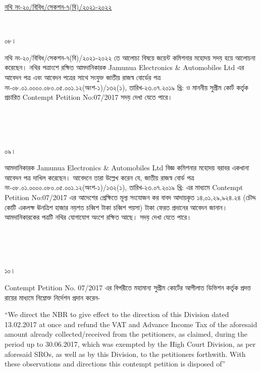 \documentclass[12pt]{article}
\begin{document}
\begin{minipage}[t]{0.59\linewidth}
\hspace{0.5em}
\end{minipage}
\begin{minipage}[t]{1\textwidth}
\underline{নথি নং-২০/বিবিধ/সেকশন-৭(বি)/২০২১-২০২২}
\end{minipage}
\\
\begin{minipage}[t]{0.05\linewidth}
০৮।
\end{minipage}
\begin{minipage}[t]{1\linewidth}
নথি নং-২০/বিবিধ/সেকশন-৭(বি)/২০২১-২০২২
তে আলোচ্য বিষয়ে জয়েন্ট কমিশনার মহোদয়
সদয় হয়ে আলোচনা করেছেন।
নথির পত্রাংশে রক্ষিত আমদানিকারক
Jamunua Electronics \& Automobiles Ltd
এর আবেদন পত্র এবং আবেদন পত্রের সাথে সংযুক্ত
জাতীয় রাজস্ব বোর্ডের পত্র
নং-০৮.০১.০০০০.০৮০.০৫.০০১.১২(অংশ-১)/১৩২(১),
তারিখ-২৩.০৭.২০১৯ খ্রি:
ও মাননীয় সুপ্রীম কোর্ট কর্তৃক প্রচারিত
Contempt Petition No:07/2017
সদয় দেখা যেতে পারে।
\end{minipage}
\\
\\
\\
\begin{minipage}[t]{0.05\linewidth}
০৯।
\end{minipage}
\begin{minipage}[t]{1\linewidth}
আমদানিকারক
Jamunua Electronics \& Automobiles Ltd
বিজ্ঞ কমিশনার মহোদয় বরাবর
একখানা আবেদন পত্র দাখিল
করেছেন। আবেদনে তারা উল্লেখ করেন যে,
জাতীয় রাজস্ব বোর্ড পত্র
নং-০৮.০১.০০০০.০৮০.০৫.০০১.১২(অংশ-১)/১৩২(১),
তারিখ-২৩.০৭.২০১৯ খ্রি:
এর মাধ্যমে
Contempt Petition No:07/2017
এর আদেশের প্রেক্ষিতে মূল্য সংযোজন কর
বাবদ আদায়কৃত
১৪,০১,২৯,৯২৪.২৪
(চৌদ্দ কোটি একলক্ষ ঊনত্রিশ হাজার নয়শত চব্বিশ টাকা চব্বিশ পয়সা) টাকা
ফেরত প্রদানের আবেদন জানান।
আমদানিকারকের পত্রটি নথির যোগাযোগ
অংশে রক্ষিত আছে।
সদয় দেখা যেতে পারে।
\end{minipage}
\\
\\
\\
\begin{minipage}[t]{0.05\linewidth}
১০।
\end{minipage}
\begin{minipage}[t]{1\linewidth}
Contempt Petition No. 07/2017
এর বিপরীতে মহামান্য সুপ্রীম কোর্টের
আপীলাত ডিভিশন কর্তৃক প্রদত্ত রায়ের
মাধ্যমে নিম্নোক্ত নির্দেশন প্রদান করেন-


\hspace{1em}``We direct the NBR
to give effect to the direction
of this Division
dated 13.02.2017
at once and refund the VAT
and Advance Income Tax
of the aforesaid amount already
collected/received from the
petitioners, as claimed, during
the period up to 30.06.2017,
which was exempted by the
High Court Division, as per
aforesaid SROs, as well as by this
Division, to the  petitioners
forthwith. With these observations
and directions this contempt
petition is disposed of''
\end{minipage}
\end{document}
